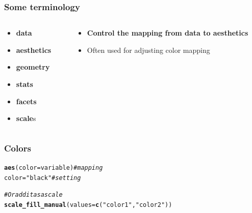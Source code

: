 \documentclass{beamer}\usepackage[]{graphicx}\usepackage[]{color}
\makeatletter
\newcommand{\hlstr}[1]{\textcolor[rgb]{0.192,0.494,0.8}{#1}}%
\newcommand{\hlcom}[1]{\textcolor[rgb]{0.678,0.584,0.686}{\textit{#1}}}%
\newcommand{\hlstd}[1]{\textcolor[rgb]{0.345,0.345,0.345}{#1}}%
\newcommand{\hlkwb}[1]{\textcolor[rgb]{0.69,0.353,0.396}{#1}}%
\newcommand{\hlkwc}[1]{\textcolor[rgb]{0.333,0.667,0.333}{#1}}%
\newcommand{\hlkwd}[1]{\textcolor[rgb]{0.737,0.353,0.396}{\textbf{#1}}}%
\newenvironment{kframe}{%
 \def\at@end@of@kframe{}%
 \ifinner\ifhmode%
  \def\at@end@of@kframe{\end{minipage}}%
  \begin{minipage}{\columnwidth}%
 \fi\fi%
 \def\FrameCommand##1{\hskip\@totalleftmargin \hskip-\fboxsep
 \colorbox{shadecolor}{##1}\hskip-\fboxsep
     \hskip-\linewidth \hskip-\@totalleftmargin \hskip\columnwidth}%
 \MakeFramed {\advance\hsize-\width
   \@totalleftmargin\z@ \linewidth\hsize
   \@setminipage}}%
 {\par\unskip\endMakeFramed%
 \at@end@of@kframe}
\newenvironment{knitrout}{}{} %
\makeatother
\begin{document}
\begin{frame}[fragile]
\frametitle{Some terminology}
\begin{columns}[t]

\begin{column}[T]{3cm}
\begin{itemize}
    \item \textbf{\color{gray}data}
    \item \textbf{\color{gray}aesthetics}
    \item \textbf{\color{gray}geometry}
    \item \textbf{\color{gray}stats}
    \item \textbf{\color{gray}facets}
    \item \textbf{scale}s
\end{itemize}
\end{column}

\begin{column}[T]{8cm}
\begin{itemize}
    \item \textbf{Control the mapping from data to aesthetics}
    \item Often used for adjusting color mapping
\end{itemize}
\end{column}

\end{columns}
\end{frame}


\begin{frame}[fragile]
\frametitle{Colors}
\begin{knitrout}\footnotesize
{}\color{fgcolor}\begin{kframe}
\begin{alltt}
\hlkwd{aes}\hlstd{(}\hlkwc{color} \hlstd{= variable)}  \hlcom{# mapping}
\hlstd{color} \hlkwb{=} \hlstr{"black"}  \hlcom{# setting}

\hlcom{# Or add it as a scale}
\hlkwd{scale_fill_manual}\hlstd{(}\hlkwc{values} \hlstd{=} \hlkwd{c}\hlstd{(}\hlstr{"color1"}\hlstd{,} \hlstr{"color2"}\hlstd{))}
\end{alltt}
\end{kframe}
\end{knitrout}

\end{frame}

\end{document}
